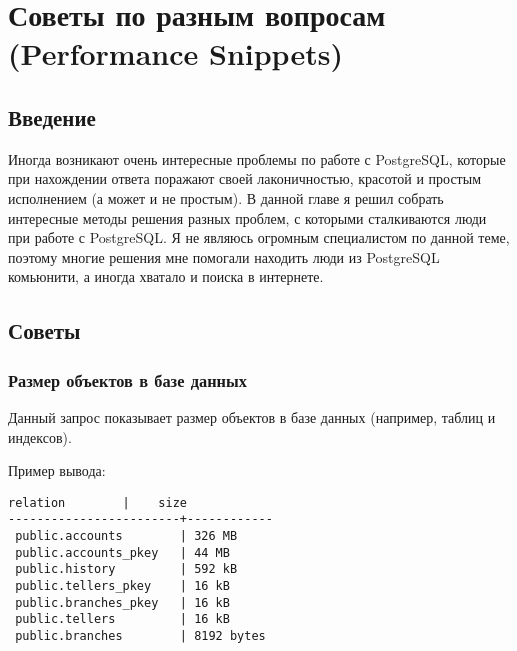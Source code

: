 \chapter{Советы по разным вопросам (Performance Snippets)}
\begin{epigraphs}
\end{epigraphs}

\section{Введение}
Иногда возникают очень интересные проблемы по работе с PostgreSQL, которые при нахождении ответа поражают своей лаконичностью,
красотой и простым исполнением (а может и не простым). В данной главе я решил собрать интересные методы решения разных проблем, с
которыми сталкиваются люди при работе с PostgreSQL. Я не являюсь огромным специалистом по данной теме, поэтому многие решения
мне помогали находить люди из PostgreSQL комьюнити, а иногда хватало и поиска в интернете.

\section{Советы}

\subsection{Размер объектов в базе данных}
Данный запрос показывает размер объектов в базе данных (например, таблиц и индексов).



Пример вывода:
\begin{lstlisting}[label=lst:snippets2,caption=Поиск самых больших объектов в БД. Пример вывода]
        relation        |    size
------------------------+------------
 public.accounts        | 326 MB
 public.accounts_pkey   | 44 MB
 public.history         | 592 kB
 public.tellers_pkey    | 16 kB
 public.branches_pkey   | 16 kB
 public.tellers         | 16 kB
 public.branches        | 8192 bytes
\end{lstlisting}

